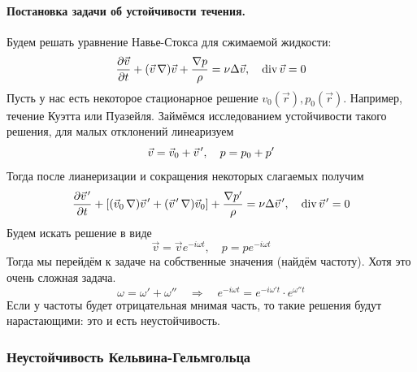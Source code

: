 \paragraph{Постановка задачи об устойчивости течения.} Будем решать 
уравнение Навье-Стокса для сжимаемой жидкости:
\begin{equation}
    \pdv{\vec{v}}{t}+ (\vec{v}\,\nabla) \vec{v} + \frac{\nabla p}{\rho}=
    \nu \Delta \vec{v}, \quad \operatorname{div} \vec{v} = 0
\end{equation}
Пусть у нас есть некоторое стационарное решение 
$v_0(\vec{r}), p_0(\vec{r})$.
Например, течение Куэтта или Пуазейля. Займёмся исследованием
устойчивости такого решения, для малых отклонений линеаризуем
\begin{equation}
    \vec{v}=\vec{v}_0+\pvec{v}', \quad p = p_0 +p'
\end{equation}
Тогда после лианеризации и сокращения некоторых слагаемых получим
\begin{equation}
    \pdv{\pvec{v}'}{t}+\qty[(\vec{v}_0\,\nabla) \pvec{v}'+
        (\pvec{v}'\,\nabla)\vec{v}_0] + \frac{\nabla p'}{\rho}=
    \nu \Delta \pvec{v}', \quad \Div \pvec{v}' = 0
\end{equation}
Будем искать решение в виде
\begin{equation}
    \vec{v} = \vec{v}e^{-i\omega t}, \quad
    p = p e^{-i\omega t}
\end{equation}
Тогда мы перейдём к задаче на собственные значения (найдём частоту).
Хотя это очень сложная задача.
\begin{equation}
    \omega = \omega'+\omega''
    \quad\Rightarrow\quad 
    e^{-i\omega t} = e^{-i\omega' t}\cdot e^{\omega'' t} 
\end{equation}
Если у частоты
будет отрицательная мнимая часть, то такие решения будут нарастающими:
это и есть неустойчивость.

\subsubsection{Неустойчивость Кельвина\hspace{0.5pt}-Гельмгольца}

